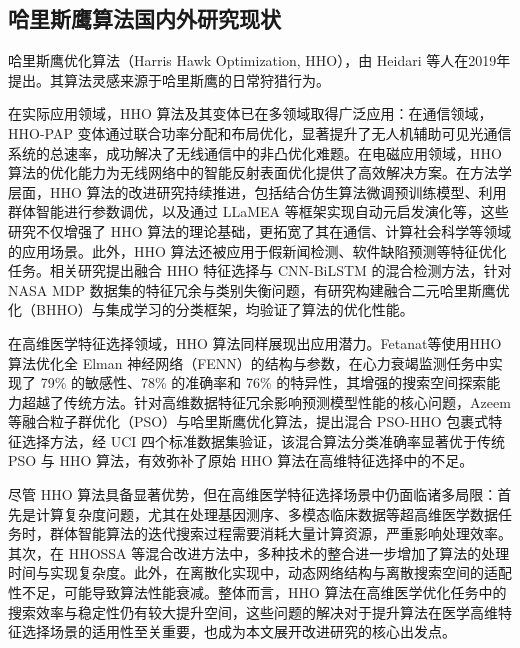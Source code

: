 \documentclass{wzuthesis}
\begin{document}
\subsection {哈里斯鹰算法国内外研究现状}

哈里斯鹰优化算法（Harris Hawk Optimization, HHO），由 Heidari 等人在2019年提出。其算法灵感来源于哈里斯鹰的日常狩猎行为。

在实际应用领域，HHO 算法及其变体已在多领域取得广泛应用：在通信领域，HHO-PAP 变体通过联合功率分配和布局优化，显著提升了无人机辅助可见光通信系统的总速率，成功解决了无线通信中的非凸优化难题。在电磁应用领域，HHO 算法的优化能力为无线网络中的智能反射表面优化提供了高效解决方案。在方法学层面，HHO 算法的改进研究持续推进，包括结合仿生算法微调预训练模型、利用群体智能进行参数调优，以及通过 LLaMEA 等框架实现自动元启发演化等，这些研究不仅增强了 HHO 算法的理论基础，更拓宽了其在通信、计算社会科学等领域的应用场景。此外，HHO 算法还被应用于假新闻检测、软件缺陷预测等特征优化任务。相关研究提出融合 HHO 特征选择与 CNN-BiLSTM 的混合检测方法，针对 NASA MDP 数据集的特征冗余与类别失衡问题，有研究构建融合二元哈里斯鹰优化（BHHO）与集成学习的分类框架，均验证了算法的优化性能。

在高维医学特征选择领域，HHO 算法同样展现出应用潜力。Fetanat等使用HHO算法优化全 Elman 神经网络（FENN）的结构与参数，在心力衰竭监测任务中实现了 79\% 的敏感性、78\% 的准确率和 76\% 的特异性，其增强的搜索空间探索能力超越了传统方法。针对高维数据特征冗余影响预测模型性能的核心问题，Azeem等融合粒子群优化（PSO）与哈里斯鹰优化算法，提出混合 PSO-HHO 包裹式特征选择方法，经 UCI 四个标准数据集验证，该混合算法分类准确率显著优于传统 PSO 与 HHO 算法，有效弥补了原始 HHO 算法在高维特征选择中的不足。

尽管 HHO 算法具备显著优势，但在高维医学特征选择场景中仍面临诸多局限：首先是计算复杂度问题，尤其在处理基因测序、多模态临床数据等超高维医学数据任务时，群体智能算法的迭代搜索过程需要消耗大量计算资源，严重影响处理效率。其次，在 HHOSSA  等混合改进方法中，多种技术的整合进一步增加了算法的处理时间与实现复杂度。此外，在离散化实现中，动态网络结构与离散搜索空间的适配性不足，可能导致算法性能衰减。整体而言，HHO 算法在高维医学优化任务中的搜索效率与稳定性仍有较大提升空间，这些问题的解决对于提升算法在医学高维特征选择场景的适用性至关重要，也成为本文展开改进研究的核心出发点。
\end{document}
